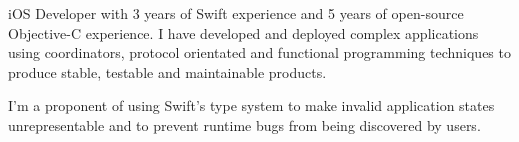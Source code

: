 %
iOS Developer with 3 years of Swift experience and 5 years of open-source
Objective-C experience.
I have developed and deployed complex applications using coordinators, protocol
orientated and functional programming techniques to produce stable, testable and
maintainable products.

\smallskip

I'm a proponent of using Swift's type system to make invalid application states
unrepresentable and to prevent runtime bugs from being discovered by users.

\bigskip

